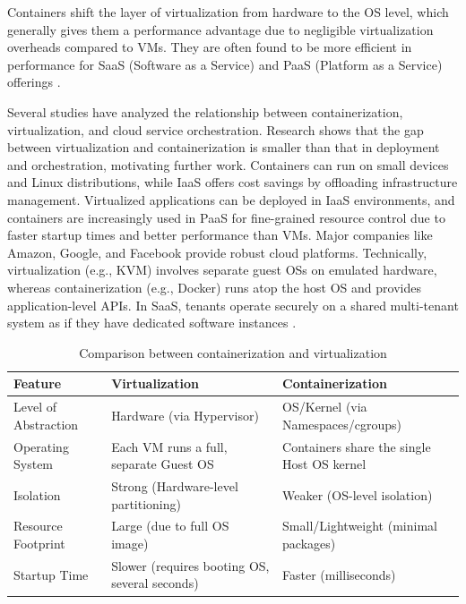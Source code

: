 Containers shift the layer of virtualization from hardware to the OS level, which generally gives them a performance advantage due to negligible virtualization overheads compared to VMs. They are often found to be more efficient in performance for SaaS (Software as a Service) and PaaS (Platform as a Service) offerings \cite{Containers_or_Hypervisors_Which_is_Better_for_Database_Consolidation, Comparison_of_Containerization_and_Virtualization_in_Cloud_Architectures}.

Several studies have analyzed the relationship between containerization, virtualization, and cloud service orchestration. Research shows that the gap between virtualization and containerization is smaller than that in deployment and orchestration, motivating further work. Containers can run on small devices and Linux distributions, while IaaS offers cost savings by offloading infrastructure management. Virtualized applications can be deployed in IaaS environments, and containers are increasingly used in PaaS for fine-grained resource control due to faster startup times and better performance than VMs. Major companies like Amazon, Google, and Facebook provide robust cloud platforms. Technically, virtualization (e.g., KVM) involves separate guest OSs on emulated hardware, whereas containerization (e.g., Docker) runs atop the host OS and provides application-level APIs. In SaaS, tenants operate securely on a shared multi-tenant system as if they have dedicated software instances \cite{Comparison_of_Containerization_and_Virtualization_in_Cloud_Architectures}.

\renewcommand{\arraystretch}{1.5} %
\begin{table}[h]
    \centering
    \begin{tabular}{|>{\raggedright\arraybackslash}p{4cm}|
                     >{\raggedright\arraybackslash}p{4cm}|
                     >{\raggedright\arraybackslash}p{4cm}|}
        \hline
        \textbf{Feature} & \textbf{Virtualization} & \textbf{Containerization} \\ \hline
        Level of Abstraction & Hardware (via Hypervisor) & OS/Kernel (via Namespaces/cgroups) \\ \hline
        Operating System & Each VM runs a full, separate Guest OS & Containers share the single Host OS kernel \\ \hline
        Isolation & Strong (Hardware-level partitioning) & Weaker (OS-level isolation) \\ \hline
        Resource Footprint & Large (due to full OS image) & Small/Lightweight (minimal packages) \\ \hline
        Startup Time & Slower (requires booting OS, several seconds) & Faster (milliseconds) \\ \hline
    \end{tabular}
    \caption{Comparison between containerization and virtualization}
    \label{tab:placeholder}
\end{table}

